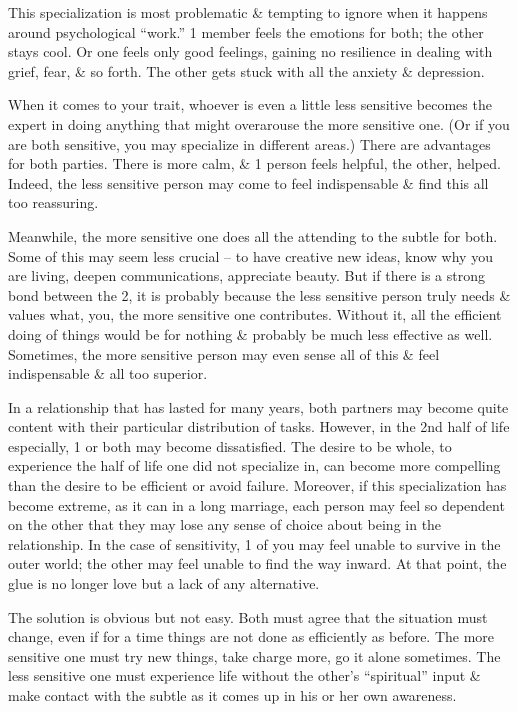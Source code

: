 \documentclass{article}
\numberwithin{equation}{section}
\begin{document}
This specialization is most problematic \& tempting to ignore when it happens around psychological ``work.'' 1 member feels the emotions for both; the other stays cool. Or one feels only good feelings, gaining no resilience in dealing with grief, fear, \& so forth. The other gets stuck with all the anxiety \& depression.

When it comes to your trait, whoever is even a little less sensitive becomes the expert in doing anything that might overarouse the more sensitive one. (Or if you are both sensitive, you may specialize in different areas.) There are advantages for both parties. There is more calm, \& 1 person feels helpful, the other, helped. Indeed, the less sensitive person may come to feel indispensable \& find this all too reassuring.

Meanwhile, the more sensitive one does all the attending to the subtle for both. Some of this may seem less crucial -- to have creative new ideas, know why you are living, deepen communications, appreciate beauty. But if there is a strong bond between the 2, it is probably because the less sensitive person truly needs \& values what, you, the more sensitive one contributes. Without it, all the efficient doing of things would be for nothing \& probably be much less effective as well. Sometimes, the more sensitive person may even sense all of this \& feel indispensable \& all too superior.

In a relationship that has lasted for many years, both partners may become quite content with their particular distribution of tasks. However, in the 2nd half of life especially, 1 or both may become dissatisfied. The desire to be whole, to experience the half of life one did not specialize in, can become more compelling than the desire to be efficient or avoid failure. Moreover, if this specialization has become extreme, as it can in a long marriage, each person may feel so dependent on the other that they may lose any sense of choice about being in the relationship. In the case of sensitivity, 1 of you may feel unable to survive in the outer world; the other may feel unable to find the way inward. At that point, the glue is no longer love but a lack of any alternative.

The solution is obvious but not easy. Both must agree that the situation must change, even if for a time things are not done as efficiently as before. The more sensitive one must try new things, take charge more, go it alone sometimes. The less sensitive one must experience life without the other's ``spiritual'' input \& make contact with the subtle as it comes up in his or her own awareness.
\end{document}
